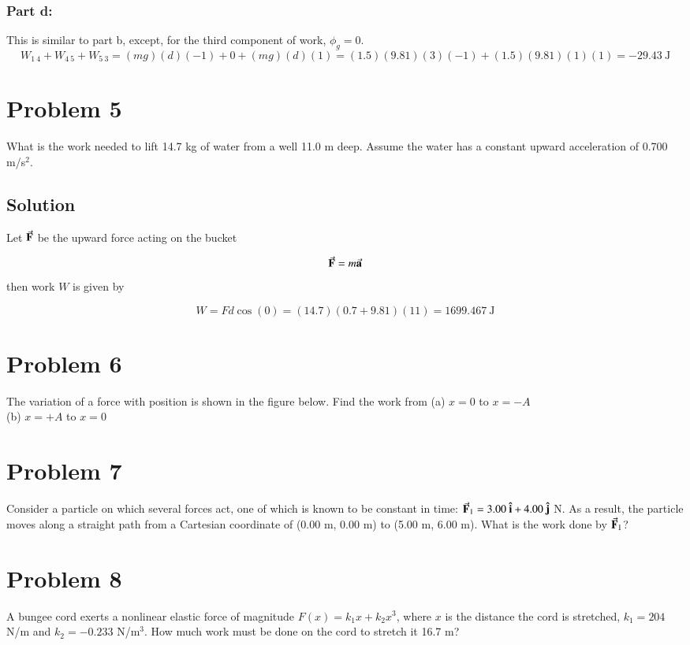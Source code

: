 \documentclass{article}
\begin{document}
\subsubsection*{Part d:}
This is similar to part b, except, for the third component of work, $\phi_g = 0$.
\[
	W_{1\ 4} + W_{4\ 5} + W_{5\ 3} = (mg)(d)(-1) + 0  + (mg)(d)(1)= (1.5)(9.81)(3)(-1) +  (1.5)(9.81)(1)(1) = \boxed{-29.43\ \text{J}}
\]

\section*{Problem 5}
What is the work needed to lift 14.7 kg of water from a well 11.0 m deep. Assume the water has a constant
upward acceleration of 0.700 m/s$^2$.

\subsection*{Solution}
Let $\va{F}$ be the upward force acting on the bucket

\[
	\va{F} = m \va{a}
\]
then work $W$ is given by

\[
	W = Fd \cos(0) = (14.7)(0.7 + 9.81)(11) = \boxed{1699.467\ \text{J}}
\]


\section*{Problem 6}
The variation of a force with position is shown in the figure below. Find the work from
(a) $x = 0$ to $x = -A$ \\
(b) $x = +A$ to $x = 0$

\section*{Problem 7}
Consider a particle on which several forces act, one of which is known to be constant in time:
$\va{F}_1 = 3.00\ \vu{i} + 4.00\ \vu{j}$ N. As a result, the particle moves along a straight path from a Cartesian coordinate of
(0.00 m, 0.00 m) to (5.00 m, 6.00 m). What is the work done by $\va{F}_1$?

\section*{Problem 8}
A bungee cord exerts a nonlinear elastic force of magnitude $F(x) = k_1 x + k_2 x^3$, where $x$ is the distance the cord is stretched, $k_1 = 204$ N/m and $k_2 = -0.233$ N/m$^3$. How much work must be done on the cord to stretch it 16.7 m?
\end{document}

